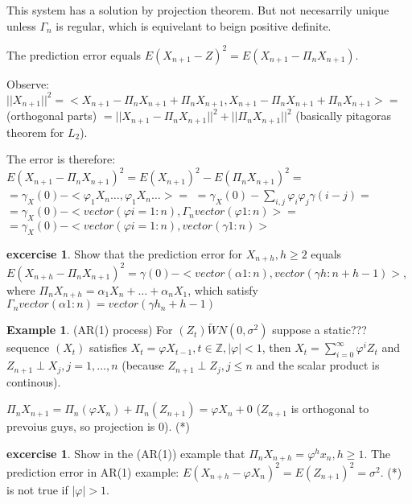 \documentclass[12pt,a4paper]{amsart}
\theoremstyle{definition} %
\newtheorem{example}[defn]{Example}
\newtheorem{excercise}[defn]{excercise}
\theoremstyle{plain} %
\newcommand{\Z}{\mathbb Z}
\begin{document}


This system has a solution by projection theorem. But not necesarrily unique unless $\Gamma_n$ is regular, which is equivelant to beign positive definite. 

The prediction error equals $E(X_{n+1} - Z)^2 = E(X_{n+1 } - \Pi_n X_{n+1})$.

Observe:
$||X_{n+1}||^2  = <X_{n+1} - \Pi_n X_{n+1} + \Pi_n X_{n+1}, X_{n+1} - \Pi_n X_{n+1} + \Pi_n X_{n+1}> = $
(orthogonal parts)
$= ||X_{n+1} - \Pi_n X_{n+1}||^2 + ||\Pi_n X_{n+1}||^2$ (basically pitagoras theorem for $L_2$).

The error is therefore:
$E(X_{n+1} - \Pi_n X_{n+1})^2 = E(X_{n+1})^2 - E(\Pi_n X_{n+1})^2 =$
$= \gamma_X(0) - <\varphi_1 X_n \dots, \varphi_1 X_n \dots> =$
$=\gamma_X(0) - \sum_{i, j} \varphi_i \varphi_j \gamma(i-j) = $
$ = \gamma_X(0) - <vector(\varphi i=1:n), \Gamma_n vector(\varphi 1:n)> = $
$= \gamma_X(0) - <vector(\varphi i=1:n),  vector(\gamma 1:n)> $

\begin{excercise}
Show that the prediction error for $X_{n+h}, h \geq 2$ equals 
$E(X_{n+h}- \Pi_nX_{n+1})^2 = \gamma(0) - <vector(\alpha 1:n), vector(\gamma h:n+h-1)>$,
where $\Pi_n X_{n+h} = \alpha_1 X_n + \dots + \alpha_n X_1$,
which satisfy 
$\Gamma_n vector(\alpha 1:n) = vector(\gamma h_n+h-1)$
\end{excercise}

\begin{example} (AR(1) process)
For $(Z_t) \tilde WN(0, \sigma^2)$ suppose a static??? sequence $(X_t)$ satisfies
$X_t = \varphi X_{t-1}, t\in \Z, |\varphi| < 1$, then
$X_t = \sum_{i = 0}^\infty \varphi^i Z_t$ and
$Z_{n+1} \perp X_j, j=1,\dots,n$ (because $Z_{n+1} \perp Z_j, j\leq n$ and the scalar product is continous).

$\Pi_n X_{n+1} = \Pi_n(\varphi X_n) + \Pi_n(Z_{n+1}) = \varphi X_n + 0$ ($Z_{n+1}$ is orthogonal to prevoius guys, so projection is $0$). (*)
\end{example}

\begin{excercise}
Show in the (AR(1)) example that 
$\Pi_n X_{n+h} = \varphi^h x_n, h \geq 1$. The prediction error in AR(1) example:
$E(X_{n+h} - \varphi X_n)^2 = E(Z_{n+1})^2 = \sigma ^2$.
(*) is not true if $|\varphi| > 1$.
\end{excercise}
\end{document}
